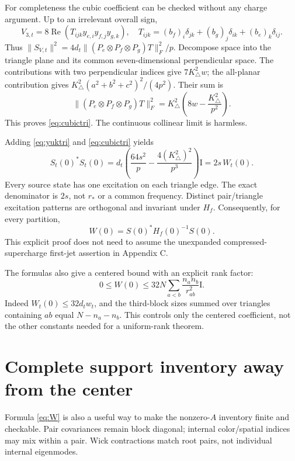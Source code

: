 \documentclass[11pt,letterpaper]{article}
\newcommand{\Id}{\mathrm I}
\begin{document}
For completeness the cubic coefficient can be checked without any charge argument. Up to an irrelevant overall sign,
\[
 V_{3,t}=8\operatorname{Re}(T_{ijk}y_{e,i}y_{f,j}y_{g,k}),\quad
 T_{ijk}=(b_f)_i\delta_{jk}+(b_g)_j\delta_{ik}+(b_e)_k\delta_{ij}.
\]
Thus $\|S_{V,t}\|^2=4d_t\|(P_e\otimes P_f\otimes P_g)T\|_F^2/p$.
Decompose space into the triangle plane and its common seven-dimensional perpendicular space. The contributions with two perpendicular indices give $7K_\triangle^2w$; the all-planar contribution gives $K_\triangle^2(a^2+b^2+c^2)^2/(4p^2)$. Their sum is
\[
 \|(P_e\otimes P_f\otimes P_g)T\|_F^2
   =K_\triangle^2\left(8w-\frac{K_\triangle^2}{p^2}\right).
\]
This proves \eqref{eq:cubictri}. The continuous collinear limit is harmless.

Adding \eqref{eq:yuktri} and \eqref{eq:cubictri} yields
\[
 S_t(0)^*S_t(0)
 =d_t\left(\frac{64s^2}{p}-\frac{4(K_\triangle^2)^2}{p^3}\right)\Id
 =2s\,W_t(0).
\]
Every source state has one excitation on each triangle edge. The exact denominator is $2s$, not $r_*$ or a common frequency. Distinct pair/triangle excitation patterns are orthogonal and invariant under $H_f$. Consequently, for every partition,
\begin{equation}
 \boxed{W(0)=S(0)^*H_f(0)^{-1}S(0)}. \label{eq:centered}
\end{equation}
This explicit proof does not need to assume the unexpanded compressed-supercharge first-jet assertion in Appendix C.

The formulas also give a centered bound with an explicit rank factor:
\[
 0\le W(0)\le 32N\sum_{a<b}\frac{n_an_b}{r_{ab}^2}\Id.
\]
Indeed $W_t(0)\le32d_tw_t$, and the third-block sizes summed over triangles containing $ab$ equal $N-n_a-n_b$. This controls only the centered coefficient, not the other constants needed for a uniform-rank theorem.

\section{Complete support inventory away from the center}
Formula \eqref{eq:W} is also a useful way to make the nonzero-$A$ inventory finite and checkable. Pair covariances remain block diagonal; internal color/spatial indices may mix within a pair. Wick contractions match root pairs, not individual internal eigenmodes.
\end{document}
